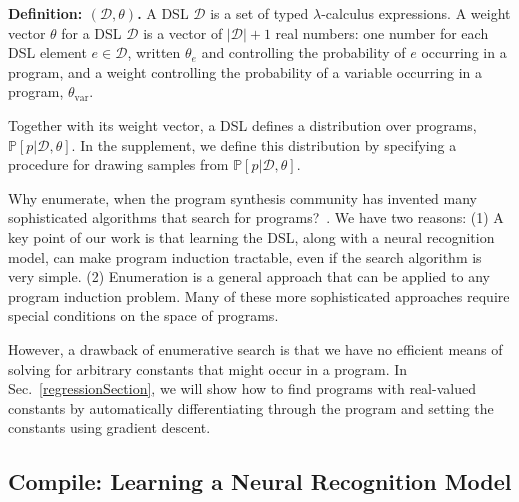 \documentclass{article}
\newcommand{\probability}{\mathds{P}} %
\begin{document}
\noindent\textbf{Definition: $(\mathcal{D},\theta)$.}
A DSL $\mathcal{D}$ is a set of typed $\lambda$-calculus expressions.
A weight vector $\theta$ for a DSL $\mathcal{D}$ is a vector of $|\mathcal{D}| + 1$ real numbers:
one number for each DSL element $e\in \mathcal{D}$, written $\theta_e$ and controlling the probability of  $e$ occurring in a program,
and a weight controlling the probability of a variable occurring in a program, $\theta_{\text{var}}$.

Together with its weight vector,
a DSL defines a distribution over programs, $\probability[p|\mathcal{D},\theta]$.
In the supplement, we define this distribution  
by specifying a procedure for drawing samples from $\probability[p|\mathcal{D},\theta]$. %


Why enumerate, when the program synthesis community has invented many
sophisticated algorithms that search for programs?~\cite{solar2008program,schkufza2013stochastic,feser2015synthesizing,osera2015type,polozov2015flashmeta,polikarpova2016program}.
We have two reasons:
(1) A key point of our work is that learning the DSL, along with a neural recognition model, can make program induction tractable, even if the search algorithm is very simple.
(2) Enumeration is a general approach that can be applied to any program induction problem. Many of these more sophisticated approaches require special conditions on
  the space of  programs.

  However, a drawback of   enumerative search  is that we have no
efficient means of solving for arbitrary constants that might occur in a
program. In Sec.~\ref{regressionSection},
we will show how to find programs with real-valued constants
by automatically differentiating through the program and setting the constants using gradient descent.







\subsection{Compile: Learning a Neural Recognition Model}\label{recognitionSection}
\end{document}
